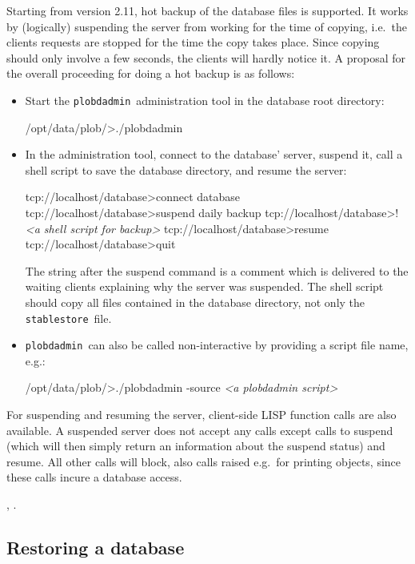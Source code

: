 Starting from version 2.11, hot backup of the database files is
supported. It works by (logically) suspending the server from working
for the time of copying, i.e.\ the clients requests are stopped for
the time the copy takes place. Since copying should only involve a few
seconds, the clients will hardly notice it.  A proposal for the
overall proceeding for doing a hot backup is as follows:

\begin{itemize}
\item Start the \texttt{plobdadmin}\ administration tool in the
  database root directory:
\begin{CompactCode}
/opt/data/plob/>./plobdadmin
\end{CompactCode}

\item In the administration tool, connect to the database' server,
  suspend it, call a shell script to save the database directory, and
  resume the server:
\begin{CompactCode}
tcp://localhost/database>connect database
tcp://localhost/database>suspend daily backup
tcp://localhost/database>! \textit{<a shell script for backup>}
tcp://localhost/database>resume
tcp://localhost/database>quit
\end{CompactCode}
The string after the suspend command is a comment which is delivered
to the waiting clients explaining why the server was suspended. The
shell script should copy all files contained in the database
directory, not only the \texttt{stablestore}\ file.

\item \texttt{plobdadmin}\ can also be called non-interactive by
  providing a script file name, e.g.:
\begin{CompactCode}
/opt/data/plob/>./plobdadmin -source \textit{<a plobdadmin script>}
\end{CompactCode}

\end{itemize}

For suspending and resuming the server, client-side LISP function
calls are also available. A suspended server does not accept any calls
except calls to suspend (which will then simply return an information
about the suspend status) and resume. All other calls will block, also
calls raised e.g.\ for printing objects, since these calls incure a
database access.

 {}, .

\subsection{Restoring a database}%
\label{sec:Restore}

